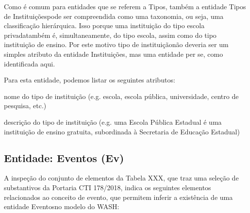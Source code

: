 \documentclass[
12pt,		%
openright,	%
twoside,  %
a4paper,			%
chapter=TITLE,		%
english,			%
french,				%
spanish,			%
brazil				%
]{USPSC-classe/USPSC}
\begin{document}
\noindent\begin{center}\mbox{\centering{}}\end{center}


Como \'e comum para entidades que se referem a \textquotedbl Tipos\textquotedbl , tamb\'em a entidade \textquotedbl Tipos de Institui\c{c}\~oes\textquotedbl  pode ser compreendida como uma taxonomia, ou seja, uma classifica\c{c}\~ao hier\'arquica. Isso porque uma institui\c{c}\~ao do tipo \textquotedbl escola privada\textquotedbl  tamb\'em \'e, simultaneamente, do tipo \textquotedbl escola\textquotedbl , assim como do tipo \textquotedbl institui\c{c}\~ao de ensino\textquotedbl . Por este motivo \textquotedbl tipo de institui\c{c}\~ao\textquotedbl  n\~ao deveria ser um simples atributo da entidade \textquotedbl Institui\c{c}\~oes\textquotedbl , mas uma entidade per se, como identificada aqui.









Para esta entidade, podemos listar os seguintes atributos:










\begin{alineas}
\item nome do tipo de institui\c{c}\~ao (e.g. escola, escola p\'ublica, universidade, centro de pesquisa, etc.)
\item descri\c{c}\~ao do tipo de institui\c{c}\~ao (e.g. \textquotedbl uma Escola P\'ublica Estadual \'e uma institui\c{c}\~ao de ensino gratuita, subordinada \`a Secretaria de Educa\c{c}\~ao Estadual\textquotedbl )
\end{alineas}

\subsection[Entidade: Eventos (Ev)]{Entidade: Eventos (Ev)}\label{Entidade: Eventos (Ev)}
A inspe\c{c}\~ao do conjunto de elementos da Tabela XXX, que traz uma sele\c{c}\~ao de substantivos da Portaria CTI 178/2018, indica os seguintes elementos relacionados ao conceito de \textquotedbl evento\textquotedbl , que permitem inferir a exist\^encia de uma entidade \textquotedbl Eventos\textquotedbl  no modelo do WASH:
\end{document}
